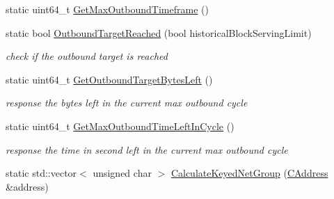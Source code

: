 \begin{DoxyCompactItemize}
static uint64\+\_\+t \mbox{\hyperlink{class_c_node_a61d4fc10d57810ebcd66a6dd6cf48027}{Get\+Max\+Outbound\+Timeframe}} ()
\item 
static bool \mbox{\hyperlink{class_c_node_a42fedfb2a9e7a61fc9662ac91d8f8e06}{Outbound\+Target\+Reached}} (bool historical\+Block\+Serving\+Limit)
\begin{DoxyCompactList}\small\item\em check if the outbound target is reached \end{DoxyCompactList}\item 
static uint64\+\_\+t \mbox{\hyperlink{class_c_node_a4f248ec86baffc7c4d97946b4887b193}{Get\+Outbound\+Target\+Bytes\+Left}} ()
\begin{DoxyCompactList}\small\item\em response the bytes left in the current max outbound cycle \end{DoxyCompactList}\item 
static uint64\+\_\+t \mbox{\hyperlink{class_c_node_a2354702a34b4f8d269732c37ae89b03f}{Get\+Max\+Outbound\+Time\+Left\+In\+Cycle}} ()
\begin{DoxyCompactList}\small\item\em response the time in second left in the current max outbound cycle \end{DoxyCompactList}\item 
static std\+::vector$<$ unsigned char $>$ \mbox{\hyperlink{class_c_node_ac3c38e33662ffa6fe861839baecf1b29}{Calculate\+Keyed\+Net\+Group}} (\mbox{\hyperlink{class_c_address}{C\+Address}} \&address)
\end{DoxyCompactItemize}

